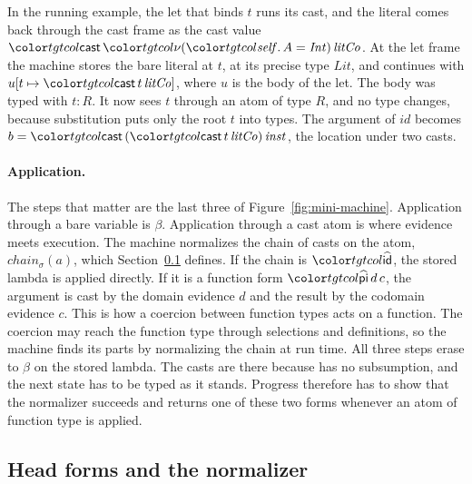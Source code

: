 In the running example, the let that binds $t$ runs its cast, and the literal comes back through the cast frame as the cast value $\ev{cast}\,\tgt{\nu(\self.\,A = \mathit{Int})}\,\mathit{litCo}$. At the let frame the machine stores the bare literal at $t$, at its precise type $\mathit{Lit}$, and continues with $u[t \mapsto \ev{cast}\,t\,\mathit{litCo}]$, where $u$ is the body of the let. The body was typed with $t : R$. It now sees $t$ through an atom of type $R$, and no type changes, because substitution puts only the root $t$ into types. The argument of $\mathit{id}$ becomes $b = \ev{cast}\,(\ev{cast}\,t\,\mathit{litCo})\,\mathit{inst}$, the location under two casts.

\paragraph{Application.}
The steps that matter are the last three of Figure~\ref{fig:mini-machine}. Application through a bare variable is $\beta$. Application through a cast atom is where evidence meets execution. The machine normalizes the chain of casts on the atom, $\mathit{chain}_\sigma(a)$, which Section~\ref{sec:mini-normalizer} defines. If the chain is $\form{id}$, the stored lambda is applied directly. If it is a function form $\form{pi}\,d\,c$, the argument is cast by the domain evidence $d$ and the result by the codomain evidence $c$. This is how a coercion between function types acts on a function. The coercion may reach the function type through selections and definitions, so the machine finds its parts by normalizing the chain at run time. All three steps erase to $\beta$ on the stored lambda. The casts are there because \FCdot has no subsumption, and the next state has to be typed as it stands. Progress therefore has to show that the normalizer succeeds and returns one of these two forms whenever an atom of function type is applied.

\FloatBarrier
\subsection{Head forms and the normalizer}\label{sec:mini-normalizer}

